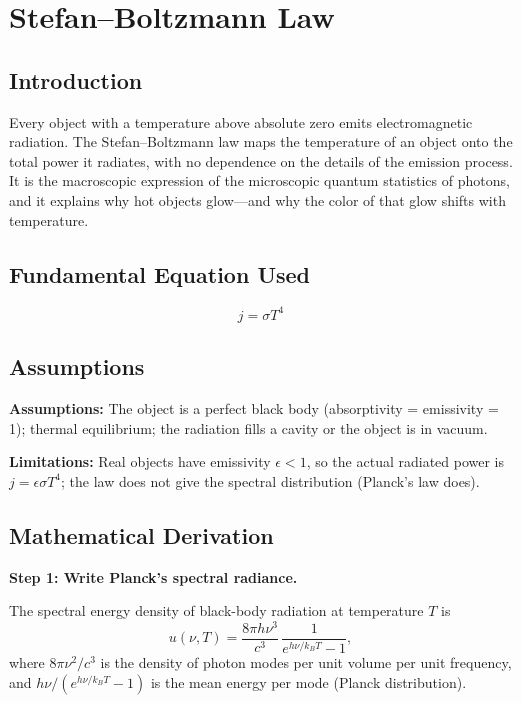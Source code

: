 \chapter{Stefan--Boltzmann Law}

\section*{Introduction}

Every object with a temperature above absolute zero emits electromagnetic radiation. The Stefan--Boltzmann law maps the temperature of an object onto the total power it radiates, with no dependence on the details of the emission process. It is the macroscopic expression of the microscopic quantum statistics of photons, and it explains why hot objects glow---and why the color of that glow shifts with temperature.
\section*{Fundamental Equation Used}

\begin{equation}
j = \sigma T^4
\end{equation}
\section*{Assumptions}

\textbf{Assumptions:} The object is a perfect black body (absorptivity = emissivity = 1); thermal equilibrium; the radiation fills a cavity or the object is in vacuum.


\textbf{Limitations:} Real objects have emissivity $\epsilon < 1$, so the actual radiated power is $j = \epsilon\sigma T^4$; the law does not give the spectral distribution (Planck's law does).


\section*{Mathematical Derivation}

\textbf{Step 1: Write Planck's spectral radiance.}

The spectral energy density of black-body radiation at temperature $T$ is
\begin{equation}
u(\nu,T) = \frac{8\pi h\nu^3}{c^3}\,\frac{1}{e^{h\nu/k_BT} - 1},
\end{equation}
where $8\pi\nu^2/c^3$ is the density of photon modes per unit volume per unit frequency, and $h\nu/(e^{h\nu/k_BT}-1)$ is the mean energy per mode (Planck distribution).

